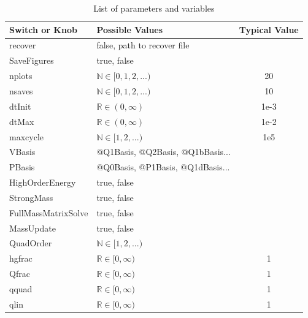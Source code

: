 \begin{table}
\centering
  \caption{List of parameters and variables}
  \label{tab:switches}
  \begin{tabular}{|l|p{2.5in}|c|}
  \hline
  Switch or Knob & Possible Values & Typical Value\\
  \hline
  \textsf{recover} & false, path to recover file &\\
  \textsf{SaveFigures} & true, false &\\
  \textsf{nplots} & $\mathbb{N} \in [0,1,2,...)$ & 20\\
  \textsf{nsaves} & $\mathbb{N} \in [0,1,2,...)$ & 10\\
  \textsf{dtInit} & $\mathbb{R} \in (0,\infty)$  & 1e-3\\
  \textsf{dtMax} &  $\mathbb{R} \in (0,\infty)$  & 1e-2\\
  \textsf{maxcycle} &  $\mathbb{N} \in [1,2,...)$ & 1e5\\
  \textsf{VBasis} & \textsf{@Q1Basis, @Q2Basis, @Q1bBasis...} & \\
  \textsf{PBasis} & \textsf{@Q0Basis, @P1Basis, @Q1dBasis...} & \\
  \textsf{HighOrderEnergy} & true, false &\\
  \textsf{StrongMass} & true, false &\\
  \textsf{FullMassMatrixSolve} & true, false &\\
  \textsf{MassUpdate} & true, false &\\
  \textsf{QuadOrder} & $\mathbb{N} \in [1,2,...)$ &\\
  \textsf{hgfrac} &  $\mathbb{R} \in [0,\infty)$ & 1 \\
  \textsf{Qfrac} &  $\mathbb{R} \in [0,\infty)$ & 1 \\
  \textsf{qquad} & $\mathbb{R} \in [0,\infty)$ & 1 \\
  \textsf{qlin} & $\mathbb{R} \in [0,\infty)$ & 1 \\
  \hline
  \end{tabular}
\end{table}


